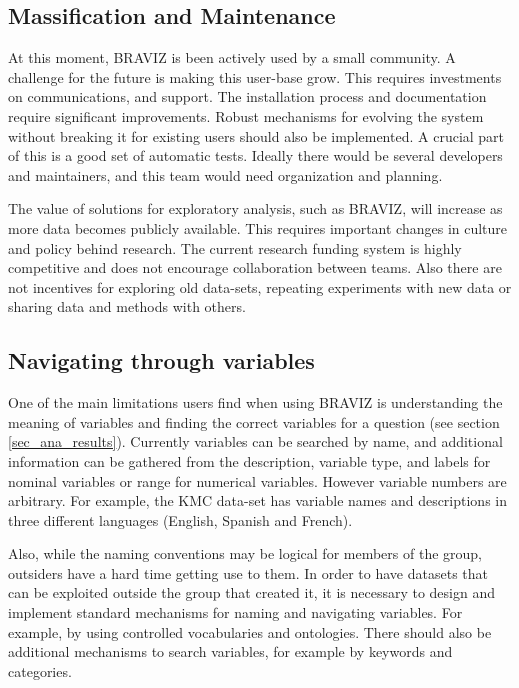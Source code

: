 {%

\subsection{Massification and Maintenance}

At this moment, BRAVIZ is been actively used by a small community. A challenge for the future is making this user-base grow. This requires investments on communications, and support. The installation process and documentation require significant improvements. Robust mechanisms for evolving the system without breaking it for existing users should also be implemented. A crucial part of this is a good set of automatic tests. Ideally there would be several developers and maintainers, and this team would need organization and planning.

The value of solutions for exploratory analysis, such as BRAVIZ, will increase as more data becomes publicly available. This requires important changes in  culture and policy behind research. The current research funding system is highly competitive and does not encourage collaboration between teams. Also there are not incentives for exploring old data-sets, repeating experiments with new data or sharing data and methods with others. 

\subsection{Navigating through variables}

One of the main limitations users find when using BRAVIZ is understanding the meaning of variables and finding the correct variables for a question (see section \ref{sec_ana_results}). Currently variables can be searched by name, and additional information can be gathered from the description, variable type, and labels for nominal variables or range for numerical variables. However variable numbers are arbitrary. For example, the KMC data-set has variable names and descriptions in three different languages (English, Spanish and French). 

Also, while the naming conventions may be logical for members of the group, outsiders have a hard time getting use to them. In order to have datasets that can be exploited outside the group  that created it, it is necessary to design and implement standard mechanisms for naming and navigating variables. For example, by using controlled vocabularies and ontologies. There should also be additional mechanisms to search variables, for example by keywords and categories.

}
